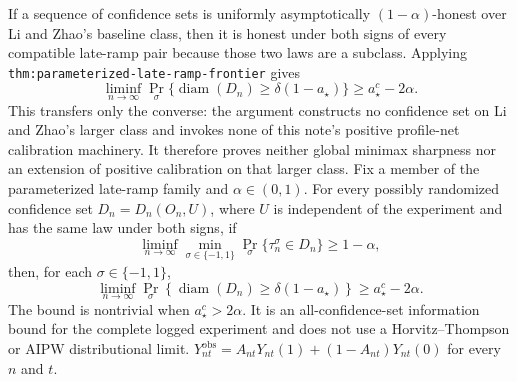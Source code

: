 If a sequence of confidence sets is uniformly asymptotically \((1-\alpha)\)-honest over Li and Zhao's baseline class, then it is honest under both signs of every compatible late-ramp pair because those two laws are a subclass. Applying \texttt{thm:parameterized-late-ramp-frontier} gives
\[
 \liminf_{n\to\infty}
 \Pr_\sigma\{\operatorname{diam}(D_n)\ge\delta(1-a_\star)\}
 \ge a_\star^c-2\alpha.
\]
This transfers only the converse: the argument constructs no confidence set on Li and Zhao's larger class and invokes none of this note's positive profile-net calibration machinery. It therefore proves neither global minimax sharpness nor an extension of positive calibration on that larger class.
Fix a member of the parameterized late-ramp family and \(\alpha\in(0,1)\). For every possibly randomized confidence set \(D_n=D_n(O_n,U)\), where \(U\) is independent of the experiment and has the same law under both signs, if
\[
 \liminf_{n\to\infty}\min_{\sigma\in\{-1,1\}}
 \Pr_\sigma\{\tau_n^\sigma\in D_n\}\ge1-\alpha,
\]
then, for each \(\sigma\in\{-1,1\}\),
\[
 \liminf_{n\to\infty}\Pr_\sigma\!\left\{
 \operatorname{diam}(D_n)\ge\delta(1-a_\star)\right\}
 \ge a_\star^c-2\alpha.
\]
The bound is nontrivial when \(a_\star^c>2\alpha\). It is an all-confidence-set information bound for the complete logged experiment and does not use a Horvitz--Thompson or AIPW distributional limit.
\(Y_{nt}^{\mathrm{obs}}=A_{nt}Y_{nt}(1)+(1-A_{nt})Y_{nt}(0)\) for every \(n\) and \(t\).
